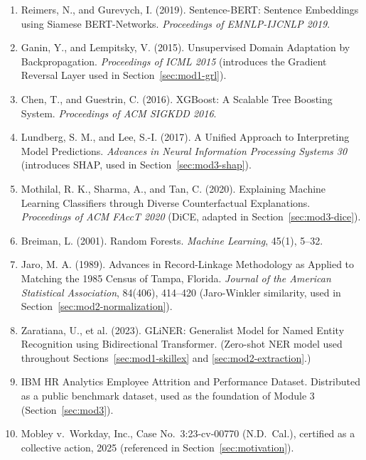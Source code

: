 \documentclass[11pt,a4paper]{article}
\begin{document}
\begin{enumerate}[leftmargin=1.4cm]
\item Reimers, N., and Gurevych, I. (2019). Sentence-BERT: Sentence Embeddings using Siamese BERT-Networks. \textit{Proceedings of EMNLP-IJCNLP 2019}.
\item Ganin, Y., and Lempitsky, V. (2015). Unsupervised Domain Adaptation by Backpropagation. \textit{Proceedings of ICML 2015} (introduces the Gradient Reversal Layer used in Section~\ref{sec:mod1-grl}).
\item Chen, T., and Guestrin, C. (2016). XGBoost: A Scalable Tree Boosting System. \textit{Proceedings of ACM SIGKDD 2016}.
\item Lundberg, S. M., and Lee, S.-I. (2017). A Unified Approach to Interpreting Model Predictions. \textit{Advances in Neural Information Processing Systems 30} (introduces SHAP, used in Section~\ref{sec:mod3-shap}).
\item Mothilal, R. K., Sharma, A., and Tan, C. (2020). Explaining Machine Learning Classifiers through Diverse Counterfactual Explanations. \textit{Proceedings of ACM FAccT 2020} (DiCE, adapted in Section~\ref{sec:mod3-dice}).
\item Breiman, L. (2001). Random Forests. \textit{Machine Learning}, 45(1), 5--32.
\item Jaro, M. A. (1989). Advances in Record-Linkage Methodology as Applied to Matching the 1985 Census of Tampa, Florida. \textit{Journal of the American Statistical Association}, 84(406), 414--420 (Jaro-Winkler similarity, used in Section~\ref{sec:mod2-normalization}).
\item Zaratiana, U., et al. (2023). GLiNER: Generalist Model for Named Entity Recognition using Bidirectional Transformer. (Zero-shot NER model used throughout Sections~\ref{sec:mod1-skillex} and \ref{sec:mod2-extraction}.)
\item IBM HR Analytics Employee Attrition and Performance Dataset. Distributed as a public benchmark dataset, used as the foundation of Module 3 (Section~\ref{sec:mod3}).
\item Mobley v.\ Workday, Inc., Case No.\ 3:23-cv-00770 (N.D.\ Cal.), certified as a collective action, 2025 (referenced in Section~\ref{sec:motivation}).
\end{enumerate}
\end{document}
